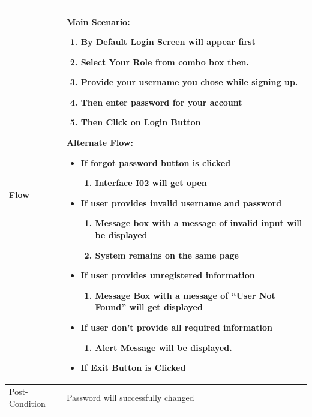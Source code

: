 \documentclass[12pt,a4paper]{report}
\begin{document}
\begin{tabular}{ | m{3cm} | m{12cm}| } 
\hline
Flow & Main Scenario:
\begin{enumerate}
\item   By Default Login Screen will appear first
\item	Select Your Role from combo box then.
\item	Provide your username you chose while signing up.
\item	Then enter password for your account
\item	Then Click on Login Button
\end{enumerate}
Alternate Flow:
\begin{itemize}
\item If forgot password button is clicked
	\begin{enumerate}
		\item Interface I02 will get open
	\end{enumerate}
\item If user provides invalid username and password
	\begin{enumerate}
	    \item	Message box with a message of invalid input will be displayed
		\item System remains on the same page
	\end{enumerate}
\item If user provides unregistered information
	\begin{enumerate}
		\item Message Box with a message of “User Not Found” will get displayed
	\end{enumerate}
\item If user don’t provide all required information
	\begin{enumerate}
		\item Alert Message will be displayed.
	\end{enumerate}
\item If Exit Button is Clicked  
\end{itemize}
\\ \hline
Post-Condition & Password will successfully changed  \\ \hline

\end{tabular}
\section{ }
\end{document}
